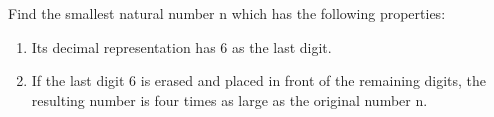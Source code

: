 
\item Find the smallest natural number n which has the following properties:
\begin{enumerate}
\item Its decimal representation has 6 as the last digit.
\item If the last digit 6 is erased and placed in front of the remaining digits,
the resulting number is four times as large as the original number n.
\end{enumerate}
